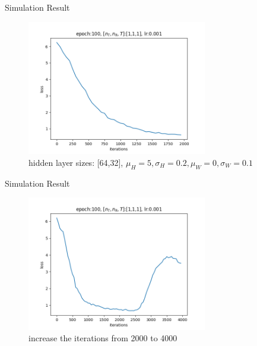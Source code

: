 \documentclass[hyperref={bookmarks=false}]{beamer}
\begin{document}
\begin{frame}{Simulation Result}

\begin{figure}
    \includegraphics[width=0.7\textwidth]{Figure_1.png}
    \caption{hidden layer sizes: [64,32], $\mu_H=5, \sigma_H=0.2, \mu_W=0, \sigma_W=0.1 $}
\end{figure}


\end{frame}

\begin{frame}{Simulation Result}

\begin{figure}
    \includegraphics[width=0.7\textwidth]{Figure_2.png}
    \caption{increase the iterations from 2000 to 4000}
\end{figure}


\end{frame}
\end{document}
